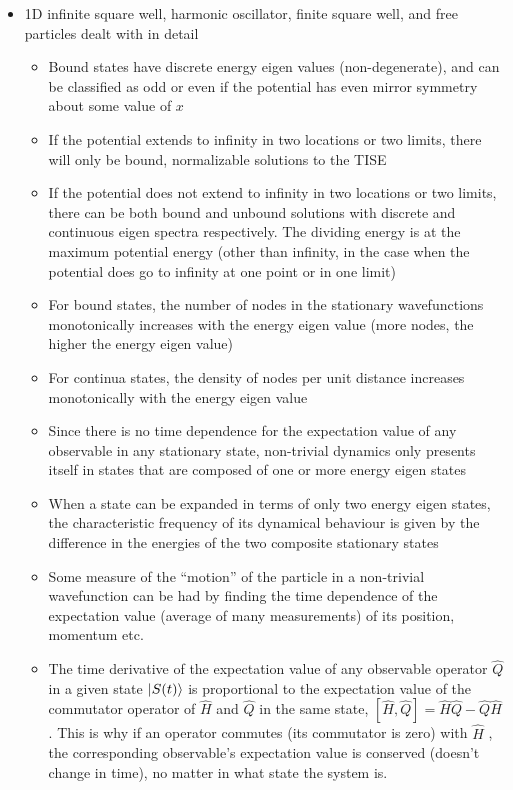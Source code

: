 \documentclass{article}
\begin{document}
\begin{itemize}
    \item 1D infinite square well, harmonic oscillator, finite square well, and free particles dealt with in detail
    
    \begin{itemize}
        \item Bound states have discrete energy eigen values (non-degenerate), and can be classified as odd or even if the potential has even mirror symmetry about some value of $x$
        \item If the potential extends to infinity in two locations or two limits, there will only be bound, normalizable solutions to the TISE
        \item If the potential does not extend to infinity in two locations or two limits, there can be both bound and unbound solutions with discrete and continuous eigen spectra respectively.  The dividing energy is at the maximum potential energy (other than infinity, in the case when the potential does go to infinity at one point or in one limit)
        \item For bound states, the number of nodes in the stationary wavefunctions monotonically increases with the energy eigen value (more nodes, the higher the energy eigen value)
        \item For continua states, the density of nodes per unit distance increases monotonically with the energy eigen value
        
        \item Since there is no time dependence for the expectation value of any observable in any stationary state, non-trivial dynamics only presents itself in states that are composed of one or more energy eigen states
        \item When a state can be expanded in terms of only two energy eigen states, the characteristic frequency of its dynamical behaviour is given by the difference in the energies of the two composite stationary states
        \item Some measure of the “motion” of the particle in a non-trivial wavefunction can be had by finding the time dependence of the expectation value (average of many measurements) of its position, momentum etc.
        \item The time derivative of the expectation value of any observable operator $\hat{Q}$ in a given state $\ket{S(t)}$ is proportional to the expectation value of the commutator operator of $\hat{H}$ and $\hat{Q}$ in the same state, $[\hat{H}, \hat{Q}] = \hat{H} \hat{Q} - \hat{Q} \hat{H}$.  This is why if an operator commutes (its commutator is zero) with $\hat{H}$ , the corresponding observable’s expectation value is conserved (doesn’t change in time), no matter in what state the system is.
        

\end{itemize}
\end{itemize}
\end{document}
